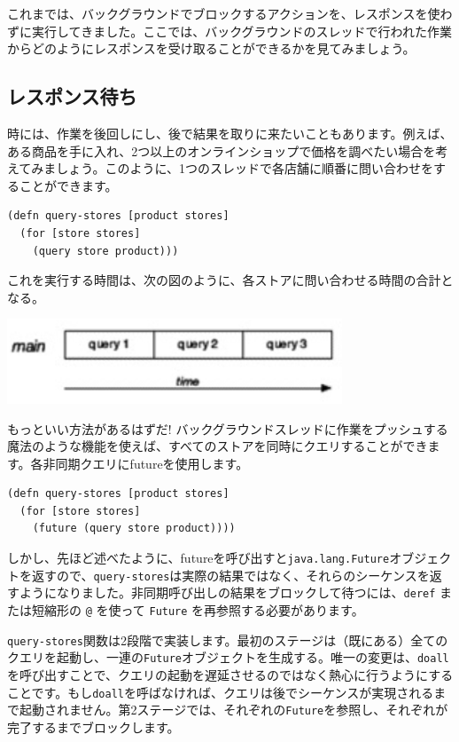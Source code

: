 これまでは、バックグラウンドでブロックするアクションを、レスポンスを使わずに実行してきました。ここでは、バックグラウンドのスレッドで行われた作業からどのようにレスポンスを受け取ることができるかを見てみましょう。

\subsection{レスポンス待ち}

時には、作業を後回しにし、後で結果を取りに来たいこともあります。例えば、ある商品を手に入れ、2つ以上のオンラインショップで価格を調べたい場合を考えてみましょう。このように、1つのスレッドで各店舗に順番に問い合わせをすることができます。

\begin{lstlisting}[numbers=none]
(defn query-stores [product stores]
  (for [store stores]
    (query store product)))
\end{lstlisting}

これを実行する時間は、次の図のように、各ストアに問い合わせる時間の合計となる。

\includegraphics[width=10cm]{fig_05_003.eps}

もっといい方法があるはずだ! バックグラウンドスレッドに作業をプッシュする魔法のような機能を使えば、すべてのストアを同時にクエリすることができます。各非同期クエリにfutureを使用します。


\begin{lstlisting}[numbers=none]
(defn query-stores [product stores]
  (for [store stores]
    (future (query store product))))
\end{lstlisting}

しかし、先ほど述べたように、futureを呼び出すと\texttt{java.lang.Future}オブジェクトを返すので、\texttt{query-stores}は実際の結果ではなく、それらのシーケンスを返すようになりました。非同期呼び出しの結果をブロックして待つには、\texttt{deref} または短縮形の \texttt{@} を使って \texttt{Future} を再参照する必要があります。

\texttt{query-stores}関数は2段階で実装します。最初のステージは（既にある）全てのクエリを起動し、一連の\texttt{Future}オブジェクトを生成する。唯一の変更は、\texttt{doall}を呼び出すことで、クエリの起動を遅延させるのではなく熱心に行うようにすることです。もし\texttt{doall}を呼ばなければ、クエリは後でシーケンスが実現されるまで起動されません。第2ステージでは、それぞれの\texttt{Future}を参照し、それぞれが完了するまでブロックします。



